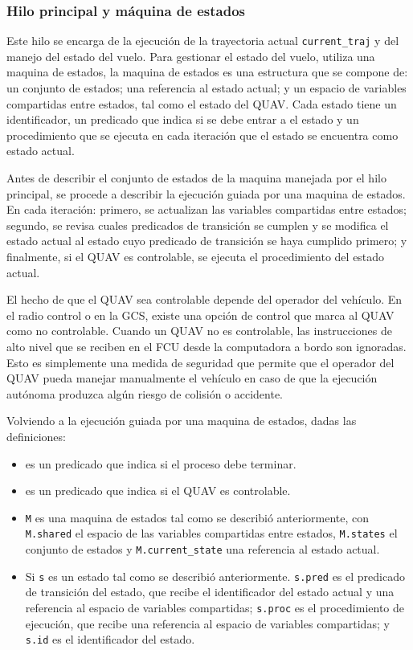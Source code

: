 \subsubsection{Hilo principal y máquina de estados}

Este hilo se encarga de la ejecución de la trayectoria actual \texttt{current\_traj} y del manejo del estado del vuelo. Para gestionar el estado del vuelo, utiliza una maquina de estados, la maquina de estados es una estructura que se compone de: un conjunto de estados; una referencia al estado actual; y un espacio de variables compartidas entre estados, tal como el estado del QUAV. Cada estado tiene un identificador, un predicado que indica si se debe entrar a el estado y un procedimiento que se ejecuta en cada iteración que el estado se encuentra como estado actual.

Antes de describir el conjunto de estados de la maquina manejada por el hilo principal, se procede a describir la ejecución guiada por una maquina de estados. En cada iteración: primero, se actualizan las variables compartidas entre estados; segundo, se revisa cuales predicados de transición se cumplen y se modifica el estado actual al estado cuyo predicado de transición se haya cumplido primero; y finalmente, si el QUAV es controlable, se ejecuta el procedimiento del estado actual. 

El hecho de que el QUAV sea controlable depende del operador del vehículo. En el radio control o en la GCS, existe una opción de control que marca al QUAV como no controlable. Cuando un QUAV no es controlable, las instrucciones de alto nivel que se reciben en el FCU desde la computadora a bordo son ignoradas. Esto es simplemente una medida de seguridad que permite que el operador del QUAV pueda manejar manualmente el vehículo en caso de que la ejecución autónoma produzca algún riesgo de colisión o accidente.

Volviendo a la ejecución guiada por una maquina de estados, dadas las definiciones:

\begin{itemize}
    \item {} es un predicado que indica si el proceso debe terminar.
    \item {} es un predicado que indica si el QUAV es controlable.
    \item \texttt{M} es una maquina de estados tal como se describió anteriormente, con \texttt{M.shared} el espacio de las variables compartidas entre estados, \texttt{M.states} el conjunto de estados y \texttt{M.current\_state} una referencia al estado actual.
    \item Si \texttt{s} es un estado tal como se describió anteriormente. \texttt{s.pred} es el predicado de transición del estado, que recibe el identificador del estado actual y una referencia al espacio de variables compartidas; \texttt{s.proc} es el procedimiento de ejecución, que recibe una referencia al espacio de variables compartidas; y \texttt{s.id} es el identificador del estado.
\end{itemize}


